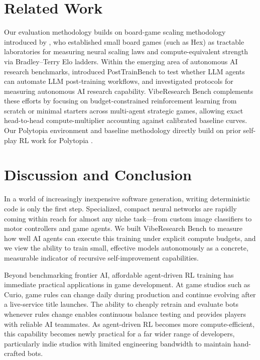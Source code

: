 \documentclass[11pt,letterpaper]{article}
\begin{document}
\section{Related Work}
\label{sec:related}

Our evaluation methodology builds on board-game scaling methodology introduced by \citet{jones2021scaling}, who established small board games (such as Hex) as tractable laboratories for measuring neural scaling laws and compute-equivalent strength via Bradley--Terry Elo ladders. Within the emerging area of autonomous AI research benchmarks, \citet{rank2026posttrainbench} introduced PostTrainBench to test whether LLM agents can automate LLM post-training workflows, and \citet{bakouch2026measuring} investigated protocols for measuring autonomous AI research capability. VibeResearch Bench complements these efforts by focusing on budget-constrained reinforcement learning from scratch or minimal starters across multi-agent strategic games, allowing exact head-to-head compute-multiplier accounting against calibrated baseline curves. Our Polytopia environment and baseline methodology directly build on prior self-play RL work for Polytopia \citep{zhang2026polytopia}.

\section{Discussion and Conclusion}
\label{sec:conclusion}

In a world of increasingly inexpensive software generation, writing deterministic code is only the first step. Specialized, compact neural networks are rapidly coming within reach for almost any niche task---from custom image classifiers to motor controllers and game agents. We built VibeResearch Bench to measure how well AI agents can execute this training under explicit compute budgets, and we view the ability to train small, effective models autonomously as a concrete, measurable indicator of recursive self-improvement capabilities.

Beyond benchmarking frontier AI, affordable agent-driven RL training has immediate practical applications in game development. At game studios such as Curio, game rules can change daily during production and continue evolving after a live-service title launches. The ability to cheaply retrain and evaluate bots whenever rules change enables continuous balance testing and provides players with reliable AI teammates. As agent-driven RL becomes more compute-efficient, this capability becomes newly practical for a far wider range of developers, particularly indie studios with limited engineering bandwidth to maintain hand-crafted bots.
\end{document}

